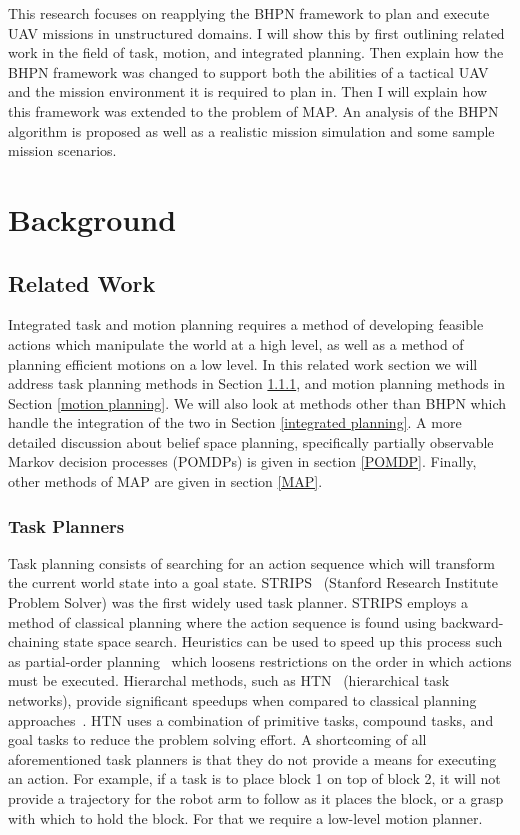 \documentclass[12pt]{article}
\begin{document}
This research focuses on reapplying the BHPN framework to plan and execute UAV missions in unstructured domains. I will show this by first outlining related work in the field of task, motion, and integrated planning. Then explain how the BHPN framework was changed to support both the abilities of a tactical UAV and the mission environment it is required to plan in. Then I will explain how this framework was extended to the problem of MAP. An analysis of the BHPN algorithm is proposed as well as a realistic mission simulation and some sample mission scenarios.

\section{Background}

\subsection{Related Work}

Integrated task and motion planning requires a method of developing feasible actions which manipulate the world at a high level, as well as a method of planning efficient motions on a low level. In this related work section we will address task planning methods in Section \ref{task planning}, and motion planning methods in Section \ref{motion planning}. We will also look at methods other than BHPN which handle the integration of the two in Section \ref{integrated planning}. A more detailed discussion about belief space planning, specifically partially observable Markov decision processes (POMDPs) is given in section \ref{POMDP}. Finally, other methods of MAP are given in section \ref{MAP}.

\subsubsection{Task Planners} \label{task planning}

Task planning consists of searching for an action sequence which will transform the current world state into a goal state. STRIPS~\cite{fikes1972strips} (Stanford Research Institute Problem Solver) was the first widely used task planner. STRIPS employs a method of classical planning where the action sequence is found using backward-chaining state space search. Heuristics can be used to speed up this process such as partial-order planning~\cite{barrett1994partial} which loosens restrictions on the order in which actions must be executed. Hierarchal methods, such as  HTN~\cite{erol1994htn} (hierarchical task networks), provide significant speedups when compared to classical planning approaches~\cite{bylander1994computational}. HTN uses a combination of primitive tasks, compound tasks, and goal tasks to reduce the problem solving effort. A shortcoming of all aforementioned task planners is that they do not provide a means for executing an action. For example, if a task is to place block 1 on top of block 2, it will not provide a trajectory for the robot arm to follow as it places the block, or a grasp with which to hold the block. For that we require a low-level motion planner.
\end{document}
